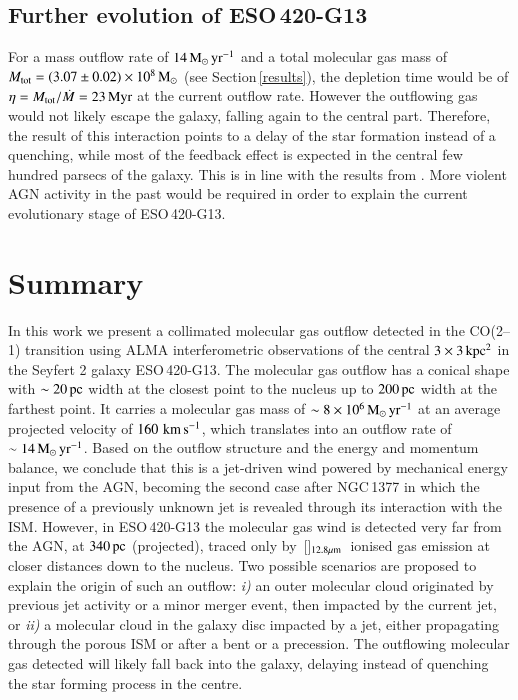 \documentclass[longauth]{aa}
\newcommand{\kms}{\,\hbox{\hbox{km}\,\hbox{s}$^{-1}$}}
\newcommand{\neii}{\,\hbox{[\ion{Ne}{ii}]$_{\rm 12.8 \mu m}$}}
\begin{document}
\subsection{Further evolution of ESO\,420-G13}\label{evol}
For a mass outflow rate of $14\, \rm{M_\odot\,yr^{-1}}$ and a total molecular gas mass of $M_{\rm tot} = (3.07 \pm 0.02) \times 10^8\, \rm{M_\odot}$ (see Section\,\ref{results}), the depletion time would be of $\eta = M_{\rm tot}/\dot{M} = 23\, \rm{Myr}$ at the current outflow rate. However the outflowing gas would not likely escape the galaxy, falling again to the central part. Therefore, the result of this interaction points to a delay of the star formation instead of a quenching, while most of the feedback effect is expected in the central few hundred parsecs of the galaxy. This is in line with the results from . More violent AGN activity in the past would be required in order to explain the current evolutionary stage of ESO\,420-G13.

\section{Summary}\label{sum}

In this work we present a collimated molecular gas outflow detected in the CO(2--1) transition using ALMA interferometric observations of the central $3 \times 3\, \rm{kpc^2}$ in the Seyfert 2 galaxy ESO\,420-G13. The molecular gas outflow has a conical shape with $\sim 20\, \rm{pc}$ width at the closest point to the nucleus up to $200\, \rm{pc}$ width at the farthest point. It carries a molecular gas mass of $\sim 8 \times 10^6\, \rm{M_\odot\, yr^{-1}}$ at an average projected velocity of $160\, \rm{\kms}$, which translates into an outflow rate of $\sim 14\, \rm{M_\odot\,yr^{-1}}$. Based on the outflow structure and the energy and momentum balance, we conclude that this is a jet-driven wind powered by mechanical energy input from the AGN, becoming the second case after NGC\,1377 in which the presence of a previously unknown jet is revealed through its interaction with the ISM. However, in ESO\,420-G13 the molecular gas wind is detected very far from the AGN, at $340\, \rm{pc}$ (projected), traced only by \neii \ ionised gas emission at closer distances down to the nucleus. Two possible scenarios are proposed to explain the origin of such an outflow: \textit{i)} an outer molecular cloud originated by previous jet activity or a minor merger event, then impacted by the current jet, or \textit{ii)} a molecular cloud in the galaxy disc impacted by a jet, either propagating through the porous ISM or after a bent or a precession. The outflowing molecular gas detected will likely fall back into the galaxy, delaying instead of quenching the star forming process in the centre.
\end{document}
